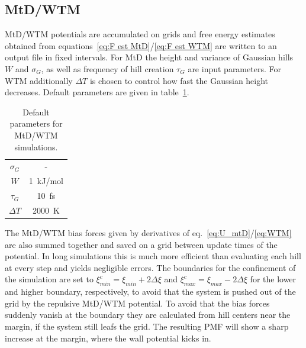 \subsection{MtD/WTM}
\label{subsec:implement MtD}
MtD/WTM potentials are accumulated on grids and free energy estimates obtained from equations~\ref{eq:F est MtD}/\ref{eq:F est WTM} are written to an output file in fixed intervals.
For MtD the height and variance of Gaussian hills $W$ and $\sigma_G$, as well as frequency of hill creation $\tau_G$ are input parameters. For WTM additionally $\Delta T$ is chosen to control how fast the Gaussian height decreases. Default parameters are given in table~\ref{tab:metaparams}.
\begin{table}[H]
      \centering
         \caption{Default parameters for MtD/WTM simulations.}
         \begin{tabular}{ c  c }
                 \hline
                  $\sigma_G$  & -        \\
                  $W$         & 1~kJ/mol \\
                  $\tau_G$    & 10~fs    \\
                  $\Delta T$  & 2000~K   \\
                 \hline
      \end{tabular}
      \label{tab:metaparams}
\end{table}
The MtD/WTM bias forces given by derivatives of eq.~\ref{eq:U_mtD}/\ref{eq:WTM} are also summed together and saved on a grid between update times of the potential.
In long simulations this is much more efficient than evaluating each hill at every step and yields negligible errors.\autocite{fiorin2013using}
The boundaries for the confinement of the simulation are set to
$\xi^c_{min}=\xi_{min}+2\Delta\xi$ and $\xi^c_{max}=\xi_{max}-2\Delta\xi$ for the lower and higher boundary, respectively, to avoid that the system is pushed out of the grid by the repulsive MtD/WTM potential.
To avoid that the bias forces suddenly vanish at the boundary they are calculated from hill centers near the margin, if the system still leafs the grid.
The resulting PMF will show a sharp increase at the margin, where the wall potential kicks in.

